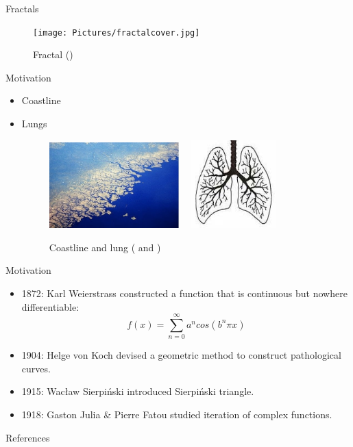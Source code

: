 \documentclass[]{beamer}
\begin{document}
\begin{frame}{Fractals}
\begin{figure}
    \centering
\texttt{[image: Pictures/fractalcover.jpg]}
    \caption{Fractal (\cite{fractalcover})}
    \label{fig:enter-label}
\end{figure}

\end{frame}

\begin{frame}{Motivation}
\begin{itemize}
    \item Coastline
    \item Lungs
\begin{figure}
    \centering
    \includegraphics[width = 5cm]{Pictures/coastline.jpg}
    \includegraphics[height = 3.4cm, width  = 4cm]{Pictures/lungs.jpg}
    \caption{Coastline and lung (\cite{COastline} and \cite{Lung})}
    \label{fig:enter-label}
\end{figure}
    
\end{itemize}
\end{frame}



\begin{frame}{Motivation}
    \begin{itemize}
        \item 1872: Karl Weierstrass constructed a function that is continuous but nowhere differentiable:
        $$f(x) = \sum\limits_{n=0}^{\infty}a^ncos(b^n\pi x)$$
    \end{itemize}
    \begin{itemize}
        \item 1904: Helge von Koch devised a geometric method to construct pathological curves.
    \end{itemize}
    \begin{itemize}
        \item 1915: Wacław Sierpiński introduced Sierpiński triangle.
    \end{itemize}
    \begin{itemize}
        \item 1918: Gaston Julia & Pierre Fatou studied iteration of complex functions.
    \end{itemize}
\end{frame}

\begin{frame}[allowframebreaks]{References}
\nocite{*}
\printbibliography
\end{frame}
\end{document}
